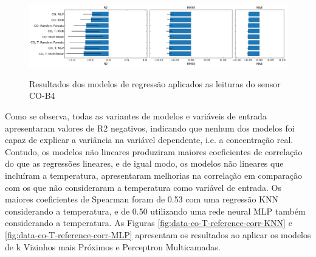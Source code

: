 \begin{figure}[h]
    \centering
    \caption{Resultados dos modelos de regressão aplicados as leituras do sensor CO-B4}
    \includegraphics[width=\textwidth]{chapters/4-CALIBRAÇÃO MÚLTIPLOS SENSORES/Figuras/co-b4-models-performance.png}
    \label{fig:data-co-b4-models-performance}
\end{figure}

Como se observa, todas as variantes de modelos e variáveis de entrada apresentaram valores de R2 negativos, indicando que nenhum dos modelos foi capaz de explicar a variância na variável dependente, i.e. a concentração real. Contudo, os modelos não lineares produziram maiores coeficientes de correlação do que as regressões lineares, e de igual modo, os modelos não lineares que incluíram a temperatura, apresentaram melhorias na correlação em comparação com os que não consideraram a temperatura como variável de entrada. Os maiores coeficientes de Spearman foram de 0.53 com uma regressão KNN considerando a temperatura, e de 0.50 utilizando uma rede neural MLP também considerando a temperatura. As Figuras \ref{fig:data-co-T-reference-corr-KNN} e \ref{fig:data-co-T-reference-corr-MLP} apresentam os resultados ao aplicar os modelos de k Vizinhos mais Próximos e Perceptron Multicamadas.


